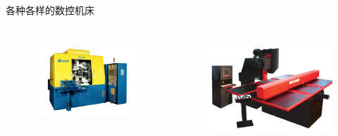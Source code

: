 \documentclass[UTF8,zihao=-4]{ctexbeamer}
\begin{document}
\begin{frame}{各种各样的数控机床}
\begin{columns}
	\begin{figure}
	\centering
	\includegraphics[width= 0.8\linewidth]{image/1-7}
	\label{fig:1-7}
\end{figure}
	\begin{figure}
		\centering
		\includegraphics[width= 0.8\linewidth]{image/1-8}
		\label{fig:1-8}
	\end{figure}
\end{columns}
\end{frame}
\end{document}
